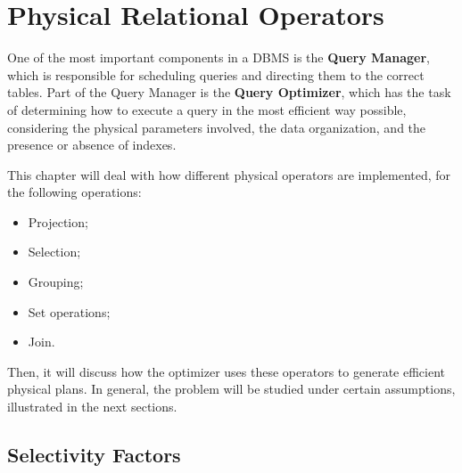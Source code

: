 \chapter{Physical Relational Operators}

One of the most important components in a DBMS is the \textbf{Query Manager}, which is responsible for scheduling queries and directing them to the correct tables. Part of the Query Manager is the \textbf{Query Optimizer}, which has the task of determining how to execute a query in the most efficient way possible, considering the physical parameters involved, the data organization, and the presence or absence of indexes.

This chapter will deal with how different physical operators are implemented, for the following operations:
\begin{itemize}
    \item Projection;
    \item Selection;
    \item Grouping;
    \item Set operations;
    \item Join.
\end{itemize}
Then, it will discuss how the optimizer uses these operators to generate efficient physical plans. In general, the problem will be studied under certain assumptions, illustrated in the next sections.

\section{Selectivity Factors}

